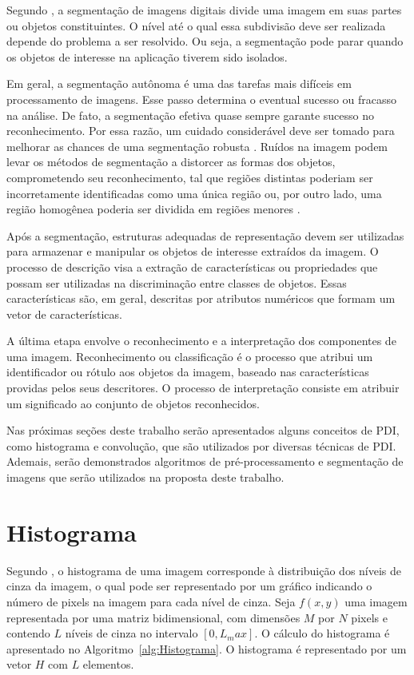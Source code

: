 \documentclass[12pt,oneside,a4paper,english,french,spanish,brazil,]{abntex2}
\begin{document}
Segundo \citet{gonzalez:2012}, a segmentação de imagens digitais divide uma imagem em suas partes ou objetos constituintes. O nível até o qual essa subdivisão deve ser realizada depende do problema a ser resolvido. Ou seja, a segmentação pode parar quando os objetos de interesse na aplicação tiverem sido isolados.

Em geral, a segmentação autônoma é uma das tarefas mais difíceis em processamento de imagens. Esse passo determina o eventual sucesso ou fracasso na análise. De fato, a segmentação efetiva quase sempre garante sucesso no reconhecimento. Por essa razão, um cuidado considerável deve ser tomado para melhorar as chances de uma segmentação robusta \cite{gonzalez:2012}. Ruídos na imagem podem levar os métodos de segmentação a distorcer as formas dos objetos, comprometendo seu reconhecimento, tal que regiões distintas poderiam ser incorretamente identificadas como uma única região ou, por outro lado, uma região homogênea poderia ser dividida em regiões menores \cite{pedrini:2008}.

Após a segmentação, estruturas adequadas de representação devem ser utilizadas para armazenar e manipular os objetos de interesse extraídos da imagem. O processo de descrição visa a extração de características ou propriedades que possam ser utilizadas na discriminação entre classes de objetos. Essas características são, em geral, descritas por atributos numéricos que formam um vetor de características.

A última etapa envolve o reconhecimento e a interpretação dos componentes de uma imagem. Reconhecimento ou classificação é o processo que atribui um identificador ou rótulo aos objetos da imagem, baseado nas características providas pelos seus descritores. O processo de interpretação consiste em atribuir um significado ao conjunto de objetos reconhecidos.

Nas próximas seções deste trabalho serão apresentados alguns conceitos de PDI, como histograma e convolução, que são utilizados por diversas técnicas de PDI. Ademais, serão demonstrados algoritmos de pré-processamento e segmentação de imagens que serão utilizados na proposta deste trabalho.

\section{Histograma}

Segundo \citet{pedrini:2008}, o histograma de uma imagem corresponde à distribuição dos níveis de cinza da imagem, o qual pode ser representado por um gráfico indicando o número de pixels na imagem para cada nível de cinza. Seja \(f(x,y)\) uma imagem representada por uma matriz bidimensional, com dimensões \(M\) por \(N\) pixels e contendo \(L\) níveis de cinza no intervalo \([0, L_max]\). O cálculo do histograma é apresentado no Algoritmo~\ref{alg:Histograma}. O histograma é representado por um vetor \(H\) com \(L\) elementos.
\end{document}
